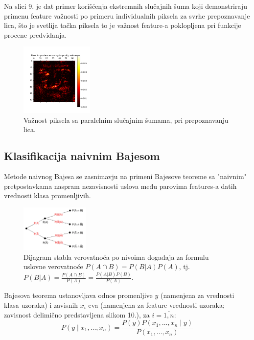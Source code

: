 \documentclass[fontsize=12bp, paper=a4]{scrarticle}
\begin{document}
    Na slici 9. je dat primer korišćenja ekstremnih slučajnih šuma koji demonstriraju primenu feature važnosti po primeru individualnih piksela za svrhe prepoznavanje lica, što je svetlija tačka piksela to je važnost feature-a poklopljena pri funkcije procene predviđanja.
    \begin{figure}[h!]
        \centering
        \includegraphics[width=0.32\textwidth]{image-8.png}
        \caption{Važnost piksela sa paralelnim slučajnim šumama, pri prepoznavanju lica.}
    \end{figure}

 
\newpage

\subsection{Klasifikacija naivnim Bajesom\cite{nb}}
Metode naivnog Bajesa se zasnimavju na primeni Bajesove teoreme sa "naivnim" pretpostavkama naspram nezavisnosti uslova među parovima features-a datih vrednosti klasa promenljivih.

\begin{figure}[h!]
    \centering
    \includegraphics[width=0.3\textwidth]{image-10}
    \caption{\centering Dijagram stabla verovatnoća po nivoima događaja za formulu uslovne verovatnoće $P(A\cap B) = P(B|A)P(A)$, tj. $P(B|A) = \frac{P(A\cap B)}{P(A)} = \frac{P(A|B)P(B)}{P(A)}$.}
\end{figure}

 Bajesova teorema ustanovljava odnos promenljive $y$ (namenjena za vrednosti klasa uzoraka) i zavisnih $x_i$-eva (namenjena za feature vrednosti uzoraka; zavisnost delimično predstavljena slikom 10.), za $i=\overline{1,n}$:
$$P(y \mid x_1, \dots, x_n) = \frac{P(y) P(x_1, \dots, x_n \mid y)}
                                 {P(x_1, \dots, x_n)}$$
\end{document}
